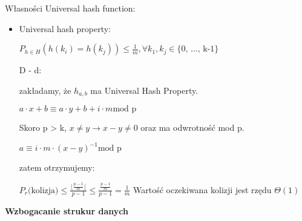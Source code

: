 \documentclass{article}
\begin{document}
    Własności Universal hash function: \par
    \begin{itemize}
        \item Universal hash property:
            \begin{center}
                $P_{h \in H} (h(k_i) = h(k_j)) \leq \frac{1}{m}, \forall k_1, k_j \in  \text{\{0, ..., k-1\}}$
            \end{center}
            D - d: \par
            zakładamy, że $h_{a, b}$ ma Universal Hash Property. \par
            $a \cdot x + b \equiv a \cdot y + b + i \cdot m \text {mod p}$ \par
            Skoro p > k, $x \neq y \rightarrow x - y \neq 0$ oraz ma odwrotność mod p. \par
            $a \equiv i \cdot m \cdot (x-y)^{-1} \text{mod p}$ \par
            zatem otrzymujemy: \par
            $P_r \text{(kolizja)} \leq \frac{\lfloor \frac{p-1}{m} \rfloor}{p-1} \leq \frac{\frac{p-1}{m}}{p-1} = \frac{1}{m}$
            \vspace{1\baselineskip}
            Wartość oczekiwana kolizji jest rzędu $\Theta(1)$
    \end{itemize}
    \vspace{1\baselineskip}
    \textbf{Wzbogacanie strukur danych} \par
\end{document}
